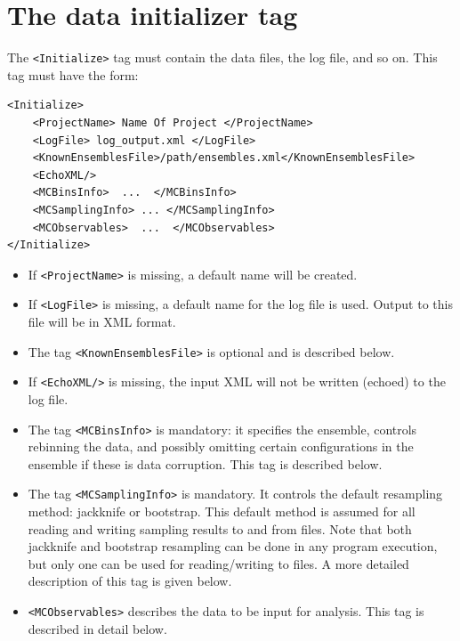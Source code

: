 \documentclass[12pt]{article}
\newcommand{\vb}{\texttt}
\begin{document}
\section{The data initializer tag}
The \vb{<Initialize>} tag must contain the data files, the log file, and so on.
This tag must have the form:
\begin{verbatim}
<Initialize>
    <ProjectName> Name Of Project </ProjectName>
    <LogFile> log_output.xml </LogFile>
    <KnownEnsemblesFile>/path/ensembles.xml</KnownEnsemblesFile>
    <EchoXML/>
    <MCBinsInfo>  ...  </MCBinsInfo>
    <MCSamplingInfo> ... </MCSamplingInfo>
    <MCObservables>  ...  </MCObservables>
</Initialize>
\end{verbatim}
\begin{itemize}
\item
  If \vb{<ProjectName>} is missing, a default name will be created.
\item
  If \vb{<LogFile>} is missing, a default name for the log file is used.
  Output to this file will be in XML format.
\item
  The tag \vb{<KnownEnsemblesFile>} is optional and is described below.
\item
  If \vb{<EchoXML/>} is missing, the input XML will not be written (echoed)
  to the log file.
\item
  The tag \vb{<MCBinsInfo>} is mandatory: it specifies the ensemble,
  controls rebinning the data, and possibly omitting certain configurations
  in the ensemble if these is data corruption.  This tag is described below.
\item
  The tag \vb{<MCSamplingInfo>} is mandatory.  It controls the default
  resampling method:  jackknife or bootstrap.  This default method
  is assumed for all reading and writing sampling results to and
  from files.  Note that both jackknife and bootstrap resampling
  can be done in any program execution, but only one can be used
  for reading/writing to files.  A more detailed
  description of this tag is given below.
\item
  \vb{<MCObservables>} describes the data to be input for analysis. This
  tag is described in detail below.
\end{itemize}
\end{document}
